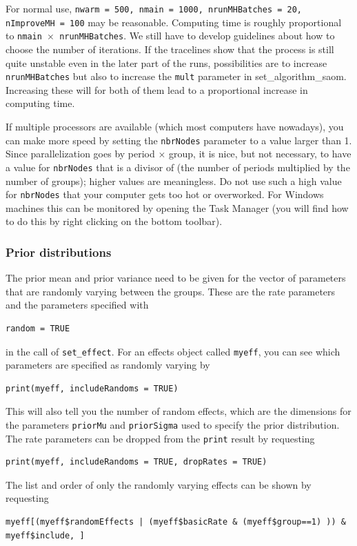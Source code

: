 \documentclass[a4paper,fleqn,11pt]{article}
\newcommand{\+}{\, + \,}
\begin{document}
For normal use, \texttt{nwarm = 500, nmain = 1000, nrunMHBatches = 20, nImproveMH = 100}
may be reasonable.
Computing time is roughly proportional to
\texttt{nmain $\times$ nrunMHBatches}.
We still have to develop guidelines about how to choose the number of
iterations. If the tracelines show that the process is still quite
unstable even in the later part of the runs, possibilities are to
increase \texttt{nrunMHBatches} but also to increase the \texttt{mult} parameter in
\textsf{set\_algorithm\_saom}. Increasing these will for both of them lead to
a proportional increase in computing time.

If multiple processors are available (which most computers have nowadays),
you can make more speed by setting the \texttt{nbrNodes} parameter to a value
larger than 1. Since parallelization goes by period $\times$ group,
it is nice, but not necessary, to have a value for \texttt{nbrNodes} that
is a divisor of (the number of periods multiplied by the number of groups);
higher values are meaningless.
Do not use such a high value for \texttt{nbrNodes} that your computer gets too
 hot or overworked. For Windows machines this can be monitored by opening
 the Task Manager (you will find how to do this by right clicking on the bottom
 toolbar).

\subsubsection{Prior distributions}

The prior mean and prior variance need to be given for the vector of parameters
that are randomly varying between the groups.
These are the rate parameters and the parameters specified with
\begin{verbatim}
random = TRUE
\end{verbatim}
in the call of \texttt{set\_effect}.
For an effects object called \texttt{myeff}, you can see which
parameters are specified as randomly varying by
\begin{verbatim}
print(myeff, includeRandoms = TRUE)
\end{verbatim}
This will also tell you the number of random effects, which are the
dimensions for the parameters \texttt{priorMu} and  \texttt{priorSigma}
used to specify the prior distribution.
The rate parameters can be dropped from the \texttt{print} result
by requesting
\begin{verbatim}
print(myeff, includeRandoms = TRUE, dropRates = TRUE)
\end{verbatim}
The list and order of only the randomly varying effects
can be shown by requesting
{\small
\begin{verbatim}
myeff[(myeff$randomEffects | (myeff$basicRate & (myeff$group==1) )) & myeff$include, ]
\end{verbatim}
}
\end{document}

